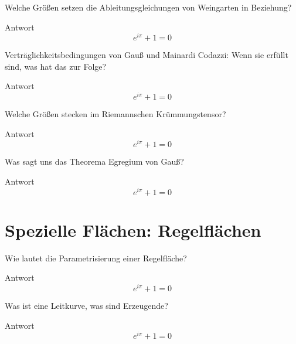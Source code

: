 \documentclass[twocolumn, fontsize=8pt, DIV=1]{scrartcl}
\begin{document}
\begin{framed}
    Welche Größen setzen die Ableitungsgleichungen von Weingarten in Beziehung?
\end{framed}
Antwort
\[
    e^{i\pi} + 1 = 0
\]



\begin{framed}
    Verträglichkeitsbedingungen von Gauß und Mainardi Codazzi: Wenn sie erfüllt sind, was hat das zur Folge?
\end{framed}
Antwort
\[
    e^{i\pi} + 1 = 0
\]



\begin{framed}
    Welche Größen stecken im Riemannschen Krümmungstensor?
\end{framed}
Antwort
\[
    e^{i\pi} + 1 = 0
\]



\begin{framed}
    Was sagt uns das Theorema Egregium von Gauß?
\end{framed}
Antwort
\[
    e^{i\pi} + 1 = 0
\]











\section{Spezielle Flächen: Regelflächen}



\begin{framed}
    Wie lautet die Parametrisierung einer Regelfläche?
\end{framed}
Antwort
\[
    e^{i\pi} + 1 = 0
\]



\begin{framed}
    Was ist eine Leitkurve, was sind Erzeugende?
\end{framed}
Antwort
\[
    e^{i\pi} + 1 = 0
\]
\end{document}
